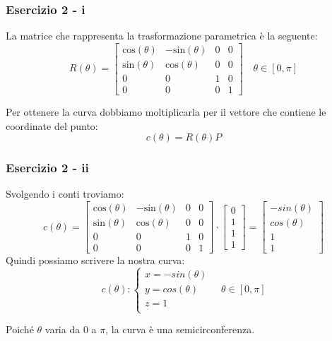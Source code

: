 \documentclass{beamer}
\begin{document}
\begin{frame}
\frametitle{Esercizio 2 - i}
La matrice che rappresenta la trasformazione parametrica \`e la seguente:
\begin{equation}
R(\theta) = 
\begin{bmatrix}
    \mbox{cos}(\theta) & - \mbox{sin}(\theta) & 0 & 0\\
    \mbox{sin}(\theta) & \mbox{cos}(\theta)   & 0 & 0\\ 
    0 & 0 & 1 & 0 \\
    0 & 0 & 0 & 1
\end{bmatrix}
\quad
    \theta \in [0, \pi]
\end{equation}

    Per ottenere la curva dobbiamo moltiplicarla per il vettore che contiene le coordinate del punto: 
    $$
    c(\theta) = R(\theta) P
    $$
\end{frame}

\begin{frame}
\frametitle{Esercizio 2 - ii}
Svolgendo i conti troviamo:
\begin{equation}
c(\theta) = 
\begin{bmatrix}
    \mbox{cos}(\theta) & - \mbox{sin}(\theta) & 0 & 0\\
    \mbox{sin}(\theta) & \mbox{cos}(\theta)   & 0 & 0\\ 
    0 & 0 & 1 & 0 \\
    0 & 0 & 0 & 1
\end{bmatrix}
\cdot
\begin{bmatrix}
    0 \\
    1 \\
    1 \\
    1
\end{bmatrix}
 = 
\begin{bmatrix}
    -sin(\theta) \\
    cos(\theta) \\
    1 \\
    1
\end{bmatrix}
\end{equation}
Quindi possiamo scrivere la nostra curva:
\begin{displaymath}
    c(\theta):
\begin{cases}
    x = -sin(\theta) \\
    y = cos(\theta) \\
    z = 1 \\
\end{cases}
\quad
    \theta \in [0, \pi]
\end{displaymath}

Poich\'e $\theta$ varia da $0$ a $\pi$, la curva \`e una semicirconferenza.
\end{frame}
\end{document}
